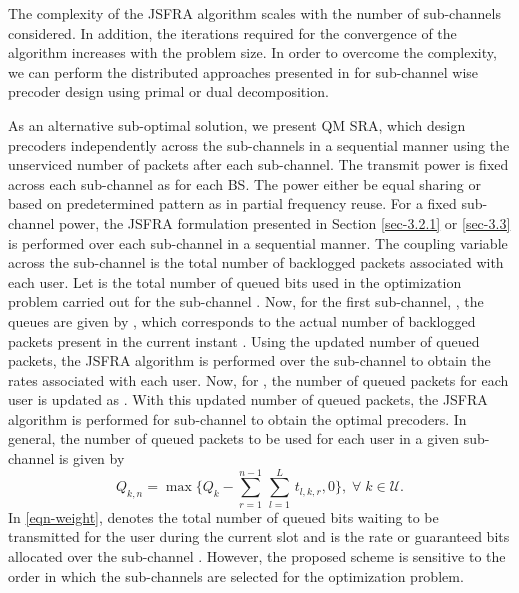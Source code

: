 
The complexity of the \ac{JSFRA} algorithm scales with the number of sub-channels considered. In addition, the iterations required for the convergence of the algorithm increases with the problem size. In order to overcome the complexity, we can perform the distributed approaches presented in \cite{palomar2006tutorial,boyd2011distributed} for sub-channel wise precoder design using primal or dual decomposition. 

As an alternative sub-optimal solution, we present \acl{QM} \ac{SRA}, which design precoders independently across the sub-channels in a sequential manner using the unserviced number of packets after each sub-channel. The transmit power is fixed across each sub-channel  as  for each \ac{BS}. The power either be equal sharing or based on predetermined pattern as in partial frequency reuse. For a fixed sub-channel power, the \ac{JSFRA} formulation presented in Section \ref{sec-3.2.1} or \ref{sec-3.3} is performed over each sub-channel in a sequential manner. The coupling variable across the sub-channel is the total number of backlogged packets associated with each user. 
Let  is the total number of queued bits used in the optimization problem carried out for the sub-channel . Now, for the first sub-channel, , the queues are given by , which corresponds to the actual number of backlogged packets present in the current instant . Using the updated number of queued packets, the \ac{JSFRA} algorithm is performed over the sub-channel  to obtain the rates associated with each user. Now, for , the number of queued packets for each user is updated as . With this updated number of queued packets, the \ac{JSFRA} algorithm is performed for  sub-channel to obtain the optimal precoders. In general, the number of queued packets to be used for each user in a given sub-channel  is given by
\begin{equation}
Q_{k,n} = \max{\Big \lbrace Q_k - \sum_{r = 1}^{n-1} \, \sum_{l = 1}^{L} \, t_{l,k,r} ,0 \Big \rbrace }, \; \forall \; k \in \mathcal{U}.
\label{eqn-weight}
\end{equation}
In \eqref{eqn-weight},  denotes the total number of queued bits waiting to be transmitted for the user  during the current slot and  is the rate or guaranteed bits allocated over the sub-channel . However, the proposed scheme is sensitive to the order in which the sub-channels are selected for the optimization problem.

